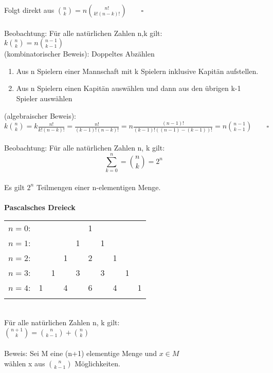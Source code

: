 \documentclass{scrartcl}\usepackage[utf8]{inputenc}
\begin{document}
Folgt direkt aus $\binom{n}{k} = n \binom{n!}{k!(n-k)!} \qquad \square $\\
\\
Beobachtung: F\"ur alle nat\"urlichen Zahlen n,k gilt:\\
$k \binom{n}{k} = n \binom{n-1}{k-1}$\\
(kombinatorischer Beweis): Doppeltes Abz\"ahlen\\
  \begin{enumerate}
    	\item Aus n Spielern einer Mannschaft mit k Spielern inklusive Kapit\"an aufstellen.
    	\item Aus n Spielern einen Kapit\"an ausw\"ahlen und dann aus den \"ubrigen k-1 Spieler ausw\"ahlen
    \end{enumerate}
(algebraischer Beweis):\\
$k \binom{n}{k} = k \frac{n!}{k!(n-k)!} = \frac{n!}{(k-1)!(n-k)!} = n\frac{(n-1)!}{(k-1)!((n-1)-(k-1))!} = n \binom{n-1}{k-1} \qquad \square $ \\
\\
Beobachtung: F\"ur alle nat\"urlichen Zahlen n, k gilt: \\
\[ \sum_{k=0}^n =\binom{n}{k} = 2^n \]\\
Es gilt $2^n$ Teilmengen einer n-elementigen Menge.\\
\\
\textbf{Pascalsches Dreieck}\\
\begin{tabular}{rccccccccc}
$n=0$:&    &    &    &    &  1\\\noalign{\smallskip\smallskip}
$n=1$:&    &    &    &  1 &    &  1\\\noalign{\smallskip\smallskip}
$n=2$:&    &    &  1 &    &  2 &    &  1\\\noalign{\smallskip\smallskip}
$n=3$:&    &  1 &    &  3 &    &  3 &    &  1\\\noalign{\smallskip\smallskip}
$n=4$:&  1 &    &  4 &    &  6 &    &  4 &    &  1\\\noalign{\smallskip\smallskip}
\end{tabular}
\\
F\"ur alle nat\"urlichen Zahlen n, k gilt: \\
$\binom{n+1}{k}= \binom{n}{k-1}+\binom{n}{k}$\\
\\
Beweis: Sei M eine (n+1) elementige Menge und $x \in M $\\
w\"ahlen x aus $\binom{n}{k-1}$ M\"oglichkeiten.\\
\end{document}
